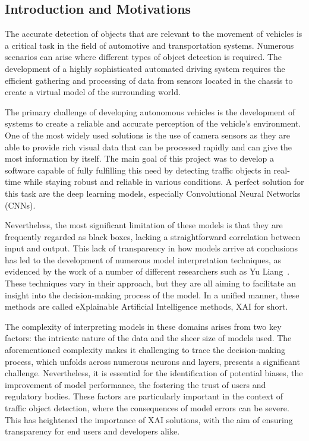 \subsection{Introduction and Motivations}\label{subsec:introduction-and-motivations} %
The accurate detection of objects that are relevant to the movement of vehicles is a critical task in the field of automotive and transportation systems.
Numerous scenarios can arise where different types of object detection is required.
The development of a highly sophisticated automated driving system requires the efficient gathering and processing of data from sensors located in the chassis to create a virtual model of the surrounding world.

The primary challenge of developing autonomous vehicles is the development of systems  to create a reliable and accurate perception of the vehicle's environment.
One of the most widely used solutions is the use of camera sensors as they are able to
provide rich visual data that can be processed rapidly and can give the most information by itself.
The main goal of this project was to develop a software capable of fully fulfilling this need by detecting traffic
objects in real-time while staying robust and reliable in various conditions.
A perfect solution for this task are the deep learning models, especially Convolutional Neural Networks (CNNs).

Nevertheless, the most significant limitation of these models is that they are frequently regarded as black boxes, lacking a straightforward correlation between input and output.
This lack of transparency in how models arrive at conclusions has led to the development of numerous model interpretation techniques,
as evidenced by the work of a number of different researchers such as Yu Liang~\cite{LIANG2021168}.
These techniques vary in their approach, but they are all aiming to facilitate an insight into the decision-making process of the model.
In a unified manner, these methods are called eXplainable Artificial Intelligence methods, XAI for short.


The complexity of interpreting models in these domains arises from two key factors: the intricate nature of the data and the sheer size of models used.
The aforementioned complexity makes it challenging to trace the decision-making process, which unfolds across numerous neurons and layers,
presents a significant challenge.
Nevertheless, it is essential for the identification of potential biases, the improvement of model performance, the fostering the trust of users and regulatory bodies.
These factors are particularly important in the context of traffic object detection, where the consequences of model errors can be severe.
This has heightened the importance of XAI solutions, with the aim of ensuring transparency for end users and developers alike.

